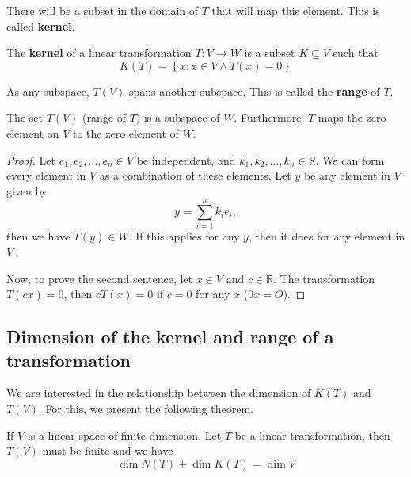 \documentclass[../linear-spaces.tex]{subfiles}
\begin{document}
There will be a subset in the domain of $T$ that will map this element. This is
called \textbf{kernel}.

\begin{definition}
    The \textbf{kernel} of a linear transformation $T: V\to W$ is a subset $K\subseteq V$ such that
    \begin{equation}
        K(T) = \left\{x: x\in V \wedge T(x)=0\right\}
    \end{equation}
\end{definition}

As any subspace, $T(V)$ spans another subspace. This is called the
\textbf{range} of $T$.

\begin{theorem}
    The set $T(V)$ (range of $T$) is a subspace of $W$.
    Furthermore, $T$ maps the zero element on $V$ to the zero element of $W$.
\end{theorem}

\begin{proof}
    Let $e_1,e_2,\dots,e_n\in V$ be independent, and $k_1,k_2,\dots,k_n\in \mathbb{R}$.
    We can form every element in $V$ as a combination of these elements. Let $y$ be any
    element in $V$ given by
    \begin{equation*}
        y = \sum_{i=1}^{n}{k_i e_i},
    \end{equation*}
    then we have $T(y)\in W$. If this applies for any $y$, then it does for any element in $V$.

    Now, to prove the second sentence, let $x\in V$ and $c\in \mathbb{R}$. The
    transformation $T(cx)=0$, then $cT(x) = 0$ if $c=0$ for any $x$ ($0x=O$).
\end{proof}

\subsection{Dimension of the kernel and range of a transformation}

We are interested in the relationship between the dimension of $K(T)$ and
$T(V)$. For this, we present the following theorem.

\begin{theorem}
    If $V$ is a linear space of finite dimension. Let $T$ be a linear transformation, then $T(V)$ must be finite and we have
    \begin{equation}
        \dim N(T) + \dim K(T) = \dim V
    \end{equation}
\end{theorem}
\end{document}
